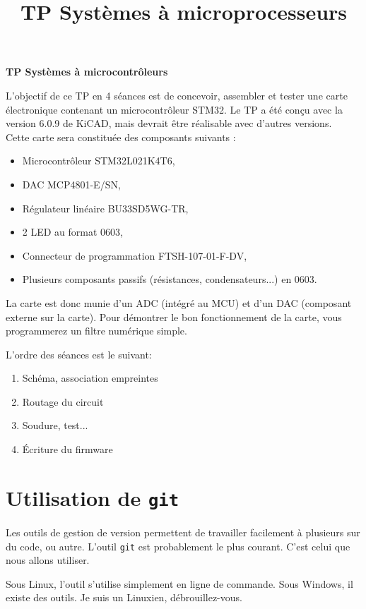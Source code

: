 \documentclass[12pt,%
addpoints,%
]{exam}
\title{TP Systèmes à microprocesseurs}
\date{}
\begin{document}
 \begin{center}
	 {\LARGE\bfseries\sffamily TP Systèmes à microcontrôleurs}
	 \vspace{1em}
  \par\bigskip
\end{center}

L'objectif de ce TP en 4 séances est de concevoir, assembler et tester une carte électronique contenant un microcontrôleur STM32.
Le TP a été conçu avec la version 6.0.9 de KiCAD, mais devrait être réalisable avec d'autres versions.\\

Cette carte sera constituée des composants suivants :
\begin{itemize}
	\item Microcontrôleur STM32L021K4T6, 
	\item DAC MCP4801-E/SN,
	\item Régulateur linéaire BU33SD5WG-TR,
	\item 2 LED au format 0603,
	\item Connecteur de programmation FTSH-107-01-F-DV,
	\item Plusieurs composants passifs (résistances, condensateurs...) en 0603.\\
\end{itemize}

La carte est donc munie d'un ADC (intégré au MCU) et d'un DAC (composant externe sur la carte).
Pour démontrer le bon fonctionnement de la carte, vous programmerez un filtre numérique simple.

L'ordre des séances est le suivant:
\begin{enumerate}
	\item Schéma, association empreintes
	\item Routage du circuit
	\item Soudure, test...
	\item Écriture du firmware
\end{enumerate}

\setcounter{section}{-1}
\section{Utilisation de \texttt{git}}
Les outils de gestion de version permettent de travailler facilement à plusieurs sur du code, ou autre.
L'outil \texttt{git} est probablement le plus courant. C'est celui que nous allons utiliser.

Sous Linux, l'outil s'utilise simplement en ligne de commande. Sous Windows, il existe des outils. Je suis un Linuxien, débrouillez-vous.
\end{document}
